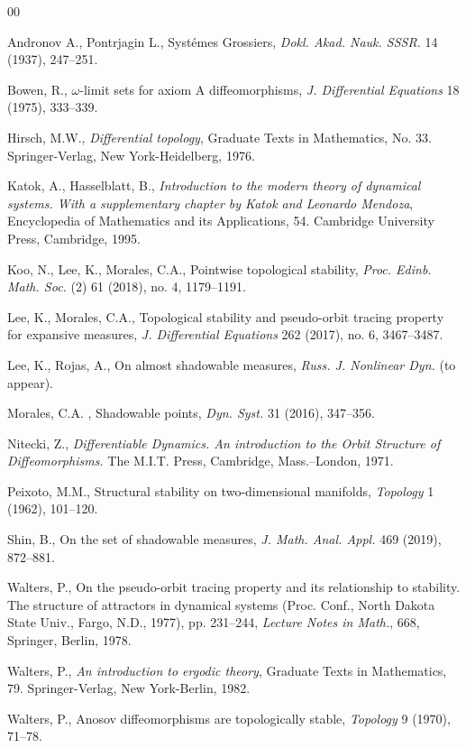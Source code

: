 \documentclass[11pt,letterpaper]{amsart}
\theoremstyle{plain}
\begin{document}
\begin{thebibliography}{00}






Andronov A., Pontrjagin L.,
Syst\' emes Grossiers,
{\em Dokl. Akad. Nauk. SSSR.} 14 (1937), 247--251.



Bowen, R.,
$\omega$-limit sets for axiom A diffeomorphisms,
{\em J. Differential Equations} 18 (1975), 333--339. 




Hirsch, M.W.,
{\em Differential topology},
Graduate Texts in Mathematics, No. 33. Springer-Verlag, New York-Heidelberg, 1976.



Katok, A., Hasselblatt, B.,
{\em Introduction to the modern theory of dynamical systems.
With a supplementary chapter by Katok and Leonardo Mendoza},
Encyclopedia of Mathematics and its Applications, 54. Cambridge University Press, Cambridge, 1995.



Koo, N., Lee, K., Morales, C.A.,
Pointwise topological stability,
{\em Proc. Edinb. Math. Soc.} (2) 61 (2018), no. 4, 1179--1191. 


Lee, K., Morales, C.A.,
Topological stability and pseudo-orbit tracing property for expansive measures,
{\em J. Differential Equations} 262 (2017), no. 6, 3467--3487. 


Lee, K., Rojas, A.,
On almost shadowable measures,
{\em Russ. J. Nonlinear Dyn.} (to appear).


Morales, C.A. ,
Shadowable points,
{\em Dyn. Syst.} 31 (2016), 347--356. 


Nitecki, Z.,
{\em Differentiable Dynamics. An introduction to the Orbit Structure of Diffeomorphisms.}
The M.I.T. Press, Cambridge, Mass.--London, 1971.


Peixoto, M.M.,
Structural stability on two-dimensional manifolds,
{\em Topology} 1 (1962), 101--120. 



 Shin, B.,
 On the set of shadowable measures,
 {\em J. Math. Anal. Appl.} 469 (2019), 872--881. 


Walters, P.,
On the pseudo-orbit tracing property and its relationship to stability.
The structure of attractors in dynamical systems (Proc. Conf., North Dakota State Univ., Fargo, N.D., 1977), pp. 231--244,
{\em Lecture Notes in Math.}, 668, Springer, Berlin, 1978.


Walters, P.,
{\em An introduction to ergodic theory},
Graduate Texts in Mathematics, 79. Springer-Verlag, New York-Berlin, 1982.


Walters, P.,
Anosov diffeomorphisms are topologically stable,
{\em Topology} 9 (1970), 71--78.



\end{thebibliography}
\end{document}
